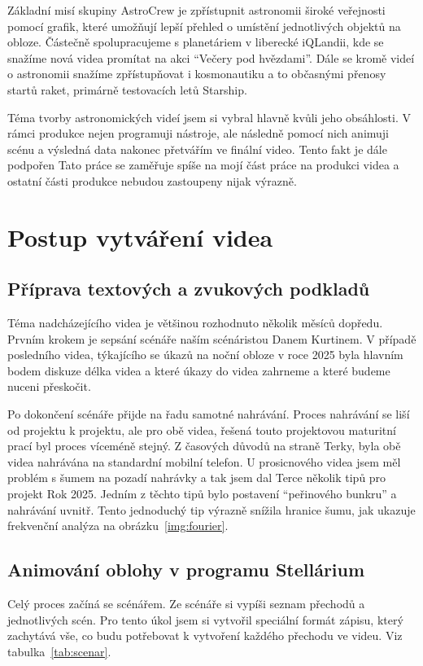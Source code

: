 \documentclass[12pt,a4paper,titlepage]{article}
\begin{document}
Základní misí skupiny AstroCrew je zpřístupnit astronomii široké veřejnosti pomocí grafik, které umožňují lepší přehled o umístění jednotlivých objektů na obloze. Částečně spolupracujeme s planetáriem v liberecké iQLandii, kde se snažíme nová videa promítat na akci \enquote{Večery pod hvězdami}. Dále se kromě videí o astronomii snažíme zpřístupňovat i kosmonautiku a to občasnými přenosy startů raket, primárně testovacích letů Starship. 

Téma tvorby astronomických videí jsem si vybral hlavně kvůli jeho obsáhlosti. V rámci produkce nejen programuji nástroje, ale následně pomocí nich animuji scénu a výsledná data nakonec přetvářím ve finální video. Tento fakt je dále podpořen Tato práce se zaměřuje spíše na mojí část práce na produkci videa a ostatní části produkce nebudou zastoupeny nijak výrazně. 
\section{Postup vytváření videa}\label{makingof}
\subsection{Příprava textových a zvukových podkladů}\label{makingof:text-audio-prep}
Téma nadcházejícího videa je většinou rozhodnuto několik měsíců dopředu. Prvním krokem je sepsání scénáře naším scénáristou Danem Kurtinem. V případě posledního videa, týkajícího se úkazů na noční obloze v roce 2025 byla hlavním bodem diskuze délka videa a které úkazy do videa zahrneme a které budeme nuceni přeskočit.

Po dokončení scénáře přijde na řadu samotné nahrávání. Proces nahrávání se liší od projektu k projektu, ale pro obě videa, řešená touto projektovou maturitní prací byl proces víceméně stejný. Z časových důvodů na straně Terky, byla obě videa nahrávána na standardní mobilní telefon. U prosicnového videa jsem měl problém s šumem na pozadí nahrávky a tak jsem dal Terce několik tipů pro projekt Rok 2025. Jedním z těchto tipů bylo postavení \enquote{peřinového bunkru} a nahrávání uvnitř. Tento jednoduchý tip výrazně snížila hranice šumu, jak ukazuje frekvenční analýza na obrázku~\ref{img:fourier}.
\subsection{Animování oblohy v programu Stellárium}\label{makingof:stellarium}
Celý proces začíná se scénářem. Ze scénáře si vypíši seznam přechodů a jednotlivých scén. Pro tento úkol jsem si vytvořil speciální formát zápisu, který zachytává vše, co budu potřebovat k vytvoření každého přechodu ve videu. Viz tabulka~\ref{tab:scenar}.
\end{document}
